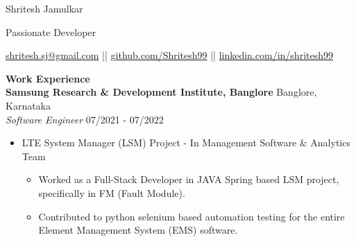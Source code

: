 \documentclass{article}
\begin{document}
\begin{center}

\LARGE Shritesh Jamulkar \\

\vspace{3pt}

\large \textcolor{NavyBlue}{Passionate Developer} \\

\vspace{5pt}

\normalsize \href{mailto:shritesh.sj@gmail@gmail.com}{shritesh.sj@gmail.com} || \href{https://github.com/Shritesh99}{github.com/Shritesh99} || \href{https://linkedin.com/in/shritesh99}{linkedin.com/in/shritesh99} \\
\end{center}

\noindent \large \textbf{\textcolor{NavyBlue}{Work Experience}} \vspace{5pt} \\
\noindent \normalsize \textbf{Samsung Research \& Development Institute, Banglore} \hfill Banglore, Karnataka \\
\textit{Software Engineer} \hfill 07/2021 - 07/2022
\begin{itemize}[noitemsep,nolistsep,leftmargin=*]
    \item {\normalsize {LTE System Manager (LSM) Project - In Management Software \& Analytics Team }
        \begin{itemize}
            \item  Worked as a Full-Stack Developer in JAVA Spring based LSM project, specifically in FM (Fault Module).
            \item Contributed to python selenium based automation testing for the entire Element Management System (EMS) software.
        \end{itemize}
    }
\end{itemize}

\vspace{5pt}
\end{document}
